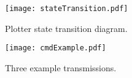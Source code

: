 \begin{figure}[h]
   \centering
   \texttt{[image: stateTransition.pdf]}
   \caption{Plotter state transition diagram.}
   \label{fig:cmdState}
\end{figure}


\begin{figure}[h]
   \centering
   \texttt{[image: cmdExample.pdf]}
   \caption{Three example transmissions.}
   \label{fig:cmdExample}
\end{figure}





